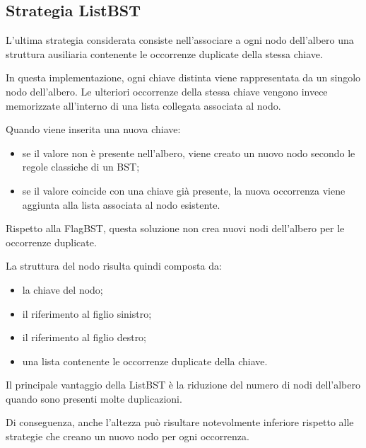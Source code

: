 \documentclass[a4paper,12pt]{article}
\begin{document}
\subsection{Strategia ListBST}

L'ultima strategia considerata consiste nell'associare a ogni nodo dell'albero una struttura ausiliaria contenente le occorrenze duplicate della stessa chiave.

In questa implementazione, ogni chiave distinta viene rappresentata da un singolo nodo dell'albero. Le ulteriori occorrenze della stessa chiave vengono invece memorizzate all'interno di una lista collegata associata al nodo.

Quando viene inserita una nuova chiave:

\begin{itemize}

    \item se il valore non è presente nell'albero, viene creato un nuovo nodo secondo le regole classiche di un BST;

    \item se il valore coincide con una chiave già presente, la nuova occorrenza viene aggiunta alla lista associata al nodo esistente.

\end{itemize}

Rispetto alla FlagBST, questa soluzione non crea nuovi nodi dell'albero per le occorrenze duplicate.

La struttura del nodo risulta quindi composta da:

\begin{itemize}

    \item la chiave del nodo;

    \item il riferimento al figlio sinistro;

    \item il riferimento al figlio destro;

    \item una lista contenente le occorrenze duplicate della chiave.

\end{itemize}

Il principale vantaggio della ListBST è la riduzione del numero di nodi dell'albero quando sono presenti molte duplicazioni.

Di conseguenza, anche l'altezza può risultare notevolmente inferiore rispetto alle strategie che creano un nuovo nodo per ogni occorrenza.
\end{document}

